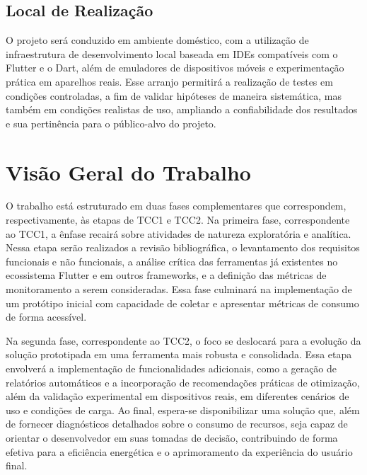 \documentclass[12pt,a4paper]{article}
\begin{document}
\subsection{Local de Realização}
O projeto será conduzido em ambiente doméstico, com a utilização de infraestrutura de desenvolvimento local baseada em IDEs compatíveis com o Flutter e o Dart, além de emuladores de dispositivos móveis e experimentação prática em aparelhos reais. Esse arranjo permitirá a realização de testes em condições controladas, a fim de validar hipóteses de maneira sistemática, mas também em condições realistas de uso, ampliando a confiabilidade dos resultados e sua pertinência para o público-alvo do projeto.

\section{Visão Geral do Trabalho}

O trabalho está estruturado em duas fases complementares que correspondem, respectivamente, às etapas de TCC1 e TCC2. Na primeira fase, correspondente ao TCC1, a ênfase recairá sobre atividades de natureza exploratória e analítica. Nessa etapa serão realizados a revisão bibliográfica, o levantamento dos requisitos funcionais e não funcionais, a análise crítica das ferramentas já existentes no ecossistema Flutter e em outros frameworks, e a definição das métricas de monitoramento a serem consideradas. Essa fase culminará na implementação de um protótipo inicial com capacidade de coletar e apresentar métricas de consumo de forma acessível.  

Na segunda fase, correspondente ao TCC2, o foco se deslocará para a evolução da solução prototipada em uma ferramenta mais robusta e consolidada. Essa etapa envolverá a implementação de funcionalidades adicionais, como a geração de relatórios automáticos e a incorporação de recomendações práticas de otimização, além da validação experimental em dispositivos reais, em diferentes cenários de uso e condições de carga. Ao final, espera-se disponibilizar uma solução que, além de fornecer diagnósticos detalhados sobre o consumo de recursos, seja capaz de orientar o desenvolvedor em suas tomadas de decisão, contribuindo de forma efetiva para a eficiência energética e o aprimoramento da experiência do usuário final.
\end{document}

